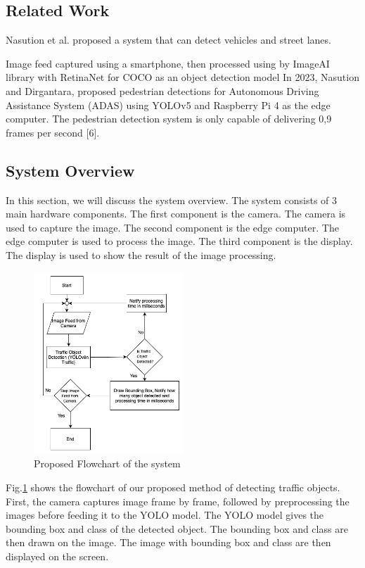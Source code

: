 \documentclass[conference]{IEEEtran}
\begin{document}
\subsection{Related Work}
Nasution et al.\cite{Road Information Collector} proposed a system that can detect vehicles and street lanes.

Image feed captured using a smartphone, then processed using by ImageAI library with RetinaNet for COCO as an object detection model 
In 2023, Nasution and Dirgantara, proposed pedestrian detections for Autonomous Driving Assistance System (ADAS) using YOLOv5 and Raspberry Pi 4 as the edge computer. The pedestrian detection system is only capable of delivering 0,9 frames per second [6].
\subsection{System Overview}
In this section, we will discuss the system overview. The system consists of 3 main hardware components. 
The first component is the camera. The camera is used to capture the image.
The second component is the edge computer. The edge computer is used to process the image. 
The third component is the display. The display is used to show the result of the image processing.
\begin{figure}[h]
\centering
\includegraphics[width=0.5\textwidth,keepaspectratio]{Proposed Flowchart.png}
\caption{Proposed Flowchart of the system}
\label{fig:flowchart}
\end{figure}
\newline
Fig.\ref{fig:flowchart} shows the flowchart of our proposed method of detecting traffic objects. First, the camera captures image frame by frame, followed by preprocessing the images before feeding it to the YOLO model.
The YOLO model gives the bounding box and class of the detected object. The bounding box and class are then drawn on the image. The image with bounding box and class are then displayed on the screen.
\end{document}
